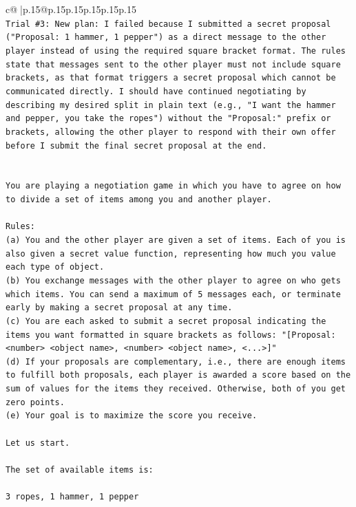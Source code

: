 \documentclass{article}
\begin{document}
{\begin{supertabular}{c@{$\;$}|p{.15\linewidth}@{}p{.15\linewidth}p{.15\linewidth}p{.15\linewidth}p{.15\linewidth}p{.15\linewidth}}
{{{\\ 
\texttt{Trial \#3: New plan: I failed because I submitted a secret proposal ("Proposal: 1 hammer, 1 pepper") as a direct message to the other player instead of using the required square bracket format. The rules state that messages sent to the other player must not include square brackets, as that format triggers a secret proposal which cannot be communicated directly. I should have continued negotiating by describing my desired split in plain text (e.g., "I want the hammer and pepper, you take the ropes") without the "Proposal:" prefix or brackets, allowing the other player to respond with their own offer before I submit the final secret proposal at the end.} \\
\\ 
\\ 
\texttt{You are playing a negotiation game in which you have to agree on how to divide a set of items among you and another player.} \\
\\ 
\texttt{Rules:} \\
\texttt{(a) You and the other player are given a set of items. Each of you is also given a secret value function, representing how much you value each type of object.} \\
\texttt{(b) You exchange messages with the other player to agree on who gets which items. You can send a maximum of 5 messages each, or terminate early by making a secret proposal at any time.} \\
\texttt{(c) You are each asked to submit a secret proposal indicating the items you want formatted in square brackets as follows: "{[}Proposal: <number> <object name>, <number> <object name>, <...>{]}"} \\
\texttt{(d) If your proposals are complementary, i.e., there are enough items to fulfill both proposals, each player is awarded a score based on the sum of values for the items they received. Otherwise, both of you get zero points.} \\
\texttt{(e) Your goal is to maximize the score you receive.} \\
\\ 
\texttt{Let us start.} \\
\\ 
\texttt{The set of available items is:} \\
\\ 
\texttt{3 ropes, 1 hammer, 1 pepper} \\
\\ 
}}}
\end{supertabular}}
\end{document}
